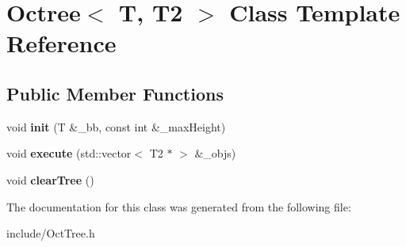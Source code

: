 \hypertarget{classOctree}{}\section{Octree$<$ T, T2 $>$ Class Template Reference}
\label{classOctree}
\subsection*{Public Member Functions}
\begin{DoxyCompactItemize}
\item 
void {\bfseries init} (T \&\+\_\+bb, const int \&\+\_\+max\+Height)\hypertarget{classOctree_a73ed2eb29a604c8d5b3dae23809515d6}{}\label{classOctree_a73ed2eb29a604c8d5b3dae23809515d6}

\item 
void {\bfseries execute} (std\+::vector$<$ T2 $\ast$ $>$ \&\+\_\+objs)\hypertarget{classOctree_a05cd8d77e4734a67e17edbc5d7c8143a}{}\label{classOctree_a05cd8d77e4734a67e17edbc5d7c8143a}

\item 
void {\bfseries clear\+Tree} ()\hypertarget{classOctree_ab1c890b12229335b05fa8bda955e3a23}{}\label{classOctree_ab1c890b12229335b05fa8bda955e3a23}

\end{DoxyCompactItemize}


The documentation for this class was generated from the following file\+:\begin{DoxyCompactItemize}
\item 
include/Oct\+Tree.\+h\end{DoxyCompactItemize}
